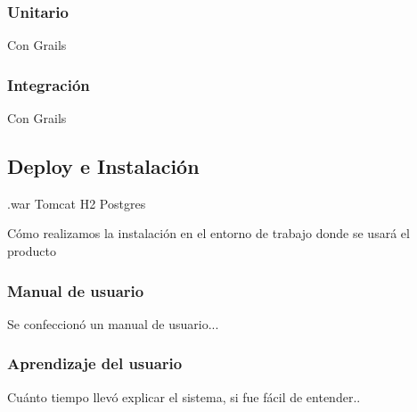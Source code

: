 \subsubsection{Unitario}
Con Grails
\subsubsection{Integración}
Con Grails
\subsection{Deploy e Instalación}
.war
Tomcat
H2
Postgres

Cómo realizamos la instalación en el entorno de trabajo donde se usará el producto
\subsubsection{Manual de usuario}
Se confeccionó un manual de usuario...
\subsubsection{Aprendizaje del usuario}
Cuánto tiempo llevó explicar el sistema, si fue fácil de entender..